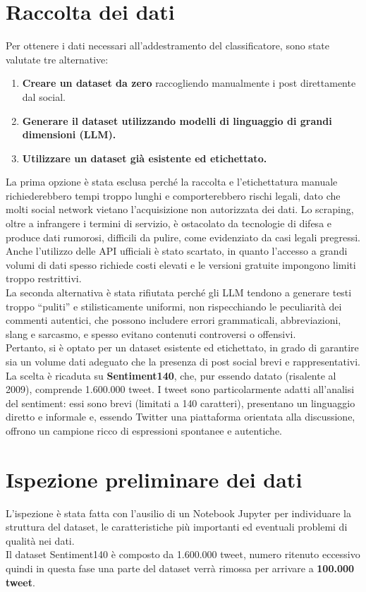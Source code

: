 \documentclass[12pt,a4paper]{report} %
\begin{document}
\section{Raccolta dei dati}
Per ottenere i dati necessari all’addestramento del classificatore, sono state valutate tre alternative:
\begin{enumerate}
    \item \textbf{Creare un dataset da zero} raccogliendo manualmente i post direttamente dal social.
    \item \textbf{Generare il dataset utilizzando modelli di linguaggio di grandi dimensioni (LLM).}
    \item \textbf{Utilizzare un dataset già esistente ed etichettato.}
\end{enumerate}
La prima opzione è stata esclusa perché la raccolta e l’etichettatura manuale richiederebbero tempi troppo lunghi e comporterebbero rischi legali, dato che molti social network vietano l’acquisizione non autorizzata dei dati. Lo scraping, oltre a infrangere i termini di servizio, è ostacolato da tecnologie di difesa e produce dati rumorosi, difficili da pulire, come evidenziato da casi legali pregressi. Anche l’utilizzo delle API ufficiali è stato scartato, in quanto l’accesso a grandi volumi di dati spesso richiede costi elevati e le versioni gratuite impongono limiti troppo restrittivi.\\La seconda alternativa è stata rifiutata perché gli LLM tendono a generare testi troppo “puliti” e stilisticamente uniformi, non rispecchiando le peculiarità dei commenti autentici, che possono includere errori grammaticali, abbreviazioni, slang e sarcasmo, e spesso evitano contenuti controversi o offensivi.\\Pertanto, si è optato per un dataset esistente ed etichettato, in grado di garantire sia un volume dati adeguato che la presenza di post social brevi e rappresentativi. La scelta è ricaduta su \textbf{Sentiment140}, che, pur essendo datato (risalente al 2009), comprende 1.600.000 tweet. I tweet sono particolarmente adatti all’analisi del sentiment: essi sono brevi (limitati a 140 caratteri), presentano un linguaggio diretto e informale e, essendo Twitter una piattaforma orientata alla discussione, offrono un campione ricco di espressioni spontanee e autentiche.
\section{Ispezione preliminare dei dati}
L'ispezione è stata fatta con l'ausilio di un Notebook Jupyter per individuare la struttura del dataset, le caratteristiche più importanti ed eventuali problemi di qualità nei dati.\\
Il dataset Sentiment140 è composto da 1.600.000 tweet, numero ritenuto eccessivo quindi in questa fase una parte del dataset verrà rimossa per arrivare a \textbf{100.000 tweet}.
\end{document}

